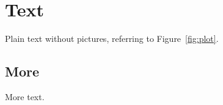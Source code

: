 \chapter{Text}
Plain text without pictures, referring to Figure~\ref{fig:plot}.
\section{More}
More text.
